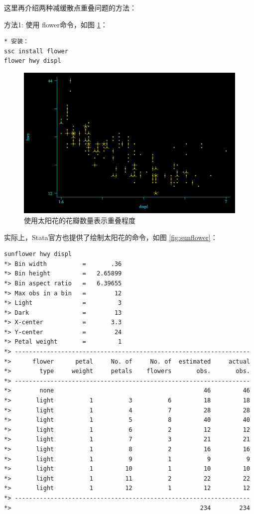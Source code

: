 这里再介绍两种减缓散点重叠问题的方法：

方法1: 使用 flower命令，如图 \ref{fig:flower}：

\begin{lstlisting}
* 安装：
ssc install flower
flower hwy displ
\end{lstlisting}

\begin{figure}[htbp]
  \centering \includegraphics[width=\textwidth]{assets/flower.png}
  \caption{使用太阳花的花瓣数量表示重叠程度}\label{fig:flower}
\end{figure}

实际上，Stata官方也提供了绘制太阳花的命令，如图 \ref{fig:sunflower}：

\begin{lstlisting}
sunflower hwy displ
*> Bin width          =       .36
*> Bin height         =   2.65899
*> Bin aspect ratio   =   6.39655
*> Max obs in a bin   =        12
*> Light              =         3
*> Dark               =        13
*> X-center           =       3.3
*> Y-center           =        24
*> Petal weight       =         1
*> ------------------------------------------------------------------
*>      flower      petal     No. of     No. of  estimated     actual
*>        type     weight     petals    flowers       obs.       obs.
*> ------------------------------------------------------------------
*>        none                                          46         46
*>       light          1          3          6         18         18
*>       light          1          4          7         28         28
*>       light          1          5          8         40         40
*>       light          1          6          2         12         12
*>       light          1          7          3         21         21
*>       light          1          8          2         16         16
*>       light          1          9          1          9          9
*>       light          1         10          1         10         10
*>       light          1         11          2         22         22
*>       light          1         12          1         12         12
*> ------------------------------------------------------------------
*>                                                     234        234
\end{lstlisting}

